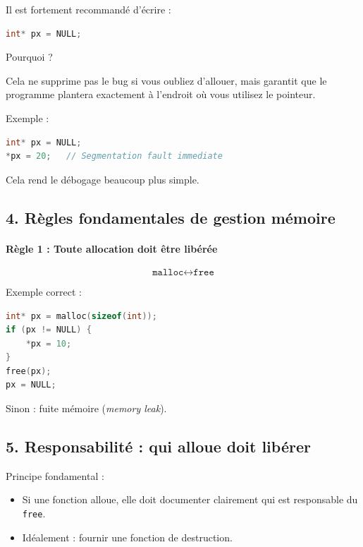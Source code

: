 Il est fortement recommandé d’écrire :

\begin{lstlisting}[language=C]
int* px = NULL;
\end{lstlisting}

Pourquoi ?

Cela ne supprime pas le bug si vous oubliez d’allouer,
mais garantit que le programme plantera exactement à l’endroit
où vous utilisez le pointeur.

Exemple :

\begin{lstlisting}[language=C]
int* px = NULL;
*px = 20;   // Segmentation fault immediate
\end{lstlisting}

Cela rend le débogage beaucoup plus simple.

\subsection{4. Règles fondamentales de gestion mémoire}

\paragraph{Règle 1 : Toute allocation doit être libérée}

\[
\boxed{\texttt{malloc} \longleftrightarrow \texttt{free}}
\]

Exemple correct :

\begin{lstlisting}[language=C]
int* px = malloc(sizeof(int));
if (px != NULL) {
    *px = 10;
}
free(px);
px = NULL;
\end{lstlisting}

Sinon : fuite mémoire (\textit{memory leak}).

\subsection{5. Responsabilité : qui alloue doit libérer}

Principe fondamental :

\begin{itemize}
    \item Si une fonction alloue, elle doit documenter clairement
    qui est responsable du \texttt{free}.
    \item Idéalement : fournir une fonction de destruction.
\end{itemize}

